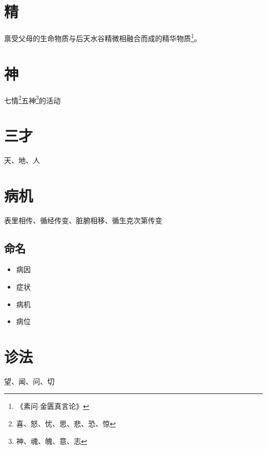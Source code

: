 \section{精}
禀受父母的生命物质与后天水谷精微相融合而成的精华物质\footnote{《素问$\cdot$金匮真言论》}。

\section{神}
七情\footnote{喜、怒、忧、思、悲、恐、惊}五神\footnote{神、魂、魄、意、志}的活动

\section{三才}
天、地、人

\section{病机}
表里相传、循经传变、脏腑相移、循生克次第传变
\subsection{命名}
\begin{itemize}
  \item 病因
  \item 症状
  \item 病机
  \item 病位
\end{itemize}

\section{诊法}
望、闻、问、切








